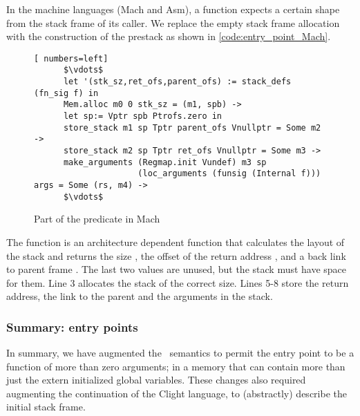 In the machine languages (Mach and Asm), a function expects a certain shape from the stack frame of its caller. We replace the empty stack frame allocation with the construction of the prestack as shown in \autoref{code:entry_point_Mach}.
\begin{figure}
\begin{lstlisting}[ numbers=left]
      $\vdots$
      let '(stk_sz,ret_ofs,parent_ofs) := stack_defs (fn_sig f) in
      Mem.alloc m0 0 stk_sz = (m1, spb) ->
      let sp:= Vptr spb Ptrofs.zero in
      store_stack m1 sp Tptr parent_ofs Vnullptr = Some m2 ->
      store_stack m2 sp Tptr ret_ofs Vnullptr = Some m3 ->
      make_arguments (Regmap.init Vundef) m3 sp
                     (loc_arguments (funsig (Internal f))) args = Some (rs, m4) ->
      $\vdots$
\end{lstlisting}
\caption[ predicate in Mach]{Part of the  predicate in Mach}\label{code:entry_point_Mach}
\end{figure}
The function  is an architecture dependent function that calculates the layout of the stack and returns the size , the offset of the return address , and a back link to parent frame . The last two values are unused, but the stack must have space for them. Line 3 allocates the stack of the correct size. Lines 5-8 store the return address, the link to the parent and the arguments in the stack. 

\subsubsection{Summary: entry points}
In summary, we have augmented the \compcert\ semantics to permit the entry point to be a function of more than zero arguments; in a memory that can contain more than just the extern initialized global variables.  These changes also required augmenting the  continuation of the Clight language, to (abstractly) describe the initial stack frame.


















